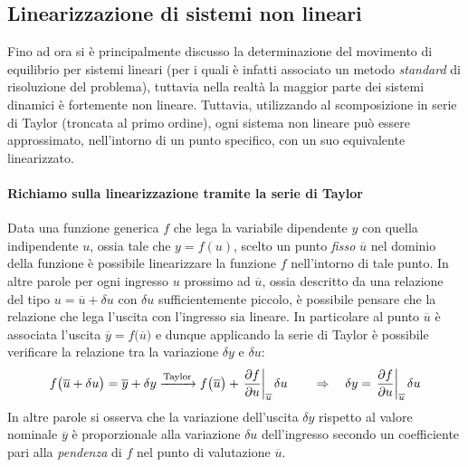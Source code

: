 	\subsection{Linearizzazione di sistemi non lineari}
		Fino ad ora si è principalmente discusso la determinazione del movimento di equilibrio per sistemi lineari (per i quali è infatti associato un metodo \textit{standard} di risoluzione del problema), tuttavia nella realtà la maggior parte dei sistemi dinamici è fortemente non lineare. Tuttavia, utilizzando al scomposizione in serie di Taylor (troncata al primo ordine), ogni sistema non lineare può essere approssimato, nell'intorno di un punto specifico, con un suo equivalente linearizzato.
		
		\paragraph{Richiamo sulla linearizzazione tramite la serie di Taylor} Data una funzione generica $f$ che lega la variabile dipendente $y$ con quella indipendente $u$, ossia tale che $y = f(u)$, scelto un punto \textit{fisso} $\overline u$ nel dominio della funzione è possibile linearizzare la funzione $f$ nell'intorno di tale punto. In altre parole per ogni ingresso $u$ prossimo ad $\overline u$, ossia descritto da una relazione del tipo $u = \overline u + \delta u$ con $\delta u$ sufficientemente piccolo, è possibile pensare che la relazione che lega l'uscita con l'ingresso sia lineare. In particolare al punto $\overline u$ è associata l'uscita $\overline y = f\big(\overline u\big)$ e dunque applicando la serie di Taylor è possibile verificare la relazione tra la variazione $\delta y$ e $\delta u$:
		\begin{equation}\label{eq:intro:taylor}
			f\big(\overline u + \delta u \big) = \overline y + \delta y \xrightarrow{\textrm{Taylor}} f\big(\overline u\big) + \left. \frac{\partial f}{\partial u} \right|_{\overline u} \delta u \qquad \Rightarrow \quad \delta y = \left. \frac{\partial f}{\partial u} \right|_{\overline u} \delta u 
		\end{equation}
		In altre parole si osserva che la variazione dell'uscita $\delta y$ rispetto al valore nominale $\overline y$ è proporzionale alla variazione $\delta u$ dell'ingresso secondo un coefficiente pari alla \textit{pendenza} di $f$ nel punto di valutazione $\overline u$.
		
